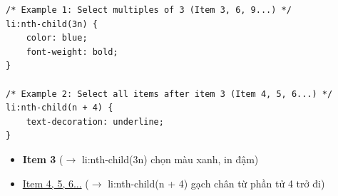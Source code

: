 \begin{codeWindow}
\begin{lstlisting}[language=CSS3]
/* Example 1: Select multiples of 3 (Item 3, 6, 9...) */
li:nth-child(3n) {
    color: blue;
    font-weight: bold;
}

/* Example 2: Select all items after item 3 (Item 4, 5, 6...) */
li:nth-child(n + 4) {
    text-decoration: underline;
}
\end{lstlisting}
\end{codeWindow}

\begin{browserWindow}
\sffamily\small
\begin{itemize}[leftmargin=1.5em, itemsep=2pt, parsep=0pt]
    \item \textcolor{primaryBlue}{\textbf{Item 3}} {\scriptsize\textcolor{gray!60}{($\rightarrow$ li:nth-child(3n) chọn màu xanh, in đậm)}}
    \item \underline{Item 4, 5, 6...} {\scriptsize\textcolor{gray!60}{($\rightarrow$ li:nth-child(n + 4) gạch chân từ phần tử 4 trở đi)}}
\end{itemize}
\end{browserWindow}

